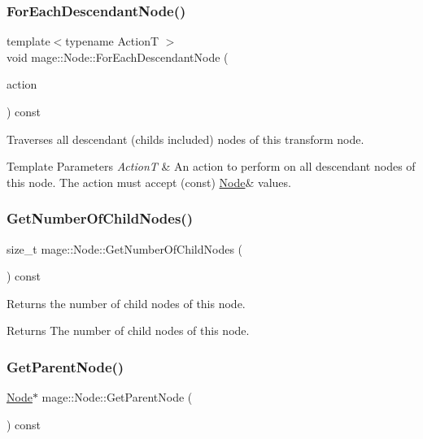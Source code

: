 \subsubsection{\texorpdfstring{For\+Each\+Descendant\+Node()}{ForEachDescendantNode()}}
{\footnotesize\ttfamily template$<$typename ActionT $>$ \\
void mage\+::\+Node\+::\+For\+Each\+Descendant\+Node (\begin{DoxyParamCaption}\item[{ActionT}]{action }\end{DoxyParamCaption}) const}

Traverses all descendant (childs included) nodes of this transform node.


\begin{DoxyTemplParams}{Template Parameters}
{\em ActionT} & An action to perform on all descendant nodes of this node. The action must accept ({\ttfamily const}) {\ttfamily \hyperlink{classmage_1_1_node}{Node}\&} values. \\
\hline
\end{DoxyTemplParams}
\hypertarget{classmage_1_1_node_ab4fff9779c09d873abcf881b6ff85d9e}{}\label{classmage_1_1_node_ab4fff9779c09d873abcf881b6ff85d9e} 
\subsubsection{\texorpdfstring{Get\+Number\+Of\+Child\+Nodes()}{GetNumberOfChildNodes()}}
{\footnotesize\ttfamily size\+\_\+t mage\+::\+Node\+::\+Get\+Number\+Of\+Child\+Nodes (\begin{DoxyParamCaption}{ }\end{DoxyParamCaption}) const\hspace{0.3cm}{\ttfamily [noexcept]}}

Returns the number of child nodes of this node.

\begin{DoxyReturn}{Returns}
The number of child nodes of this node. 
\end{DoxyReturn}
\hypertarget{classmage_1_1_node_a21ba704ed3af4c80d096ad5f393da8e0}{}\label{classmage_1_1_node_a21ba704ed3af4c80d096ad5f393da8e0} 
\subsubsection{\texorpdfstring{Get\+Parent\+Node()}{GetParentNode()}}
{\footnotesize\ttfamily \hyperlink{classmage_1_1_node}{Node}$\ast$ mage\+::\+Node\+::\+Get\+Parent\+Node (\begin{DoxyParamCaption}{ }\end{DoxyParamCaption}) const\hspace{0.3cm}{\ttfamily [noexcept]}}

